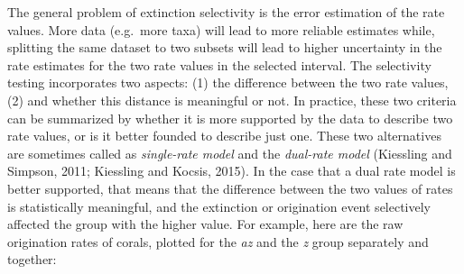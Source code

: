 \documentclass[]{article}
\begin{document}
The general problem of extinction selectivity is the error estimation of
the rate values. More data (e.g.~more taxa) will lead to more reliable
estimates while, splitting the same dataset to two subsets will lead to
higher uncertainty in the rate estimates for the two rate values in the
selected interval. The selectivity testing incorporates two aspects: (1)
the difference between the two rate values, (2) and whether this
distance is meaningful or not. In practice, these two criteria can be
summarized by whether it is more supported by the data to describe two
rate values, or is it better founded to describe just one. These two
alternatives are sometimes called as \emph{single-rate model} and the
\emph{dual-rate model} (Kiessling and Simpson, 2011; Kiessling and
Kocsis, 2015). In the case that a dual rate model is better supported,
that means that the difference between the two values of rates is
statistically meaningful, and the extinction or origination event
selectively affected the group with the higher value. For example, here
are the raw origination rates of corals, plotted for the \emph{az} and
the \emph{z} group separately and together:
\end{document}
